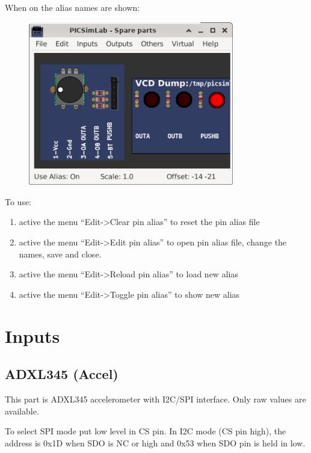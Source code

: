 When on the alias names are shown:
\begin{figure}[H]
\center
\includegraphics[width=0.80\textwidth]{img/pin_alias_on.png} 
\end{figure} 

To use:
\begin{enumerate}
 \item active the menu ``Edit->Clear pin alias'' to reset the pin alias file
 \item active the menu ``Edit->Edit pin alias'' to open pin alias file, change the names, save and close.
 \item active the menu ``Edit->Reload pin alias'' to load new alias
 \item active the menu ``Edit->Toggle pin alias'' to show new alias
\end{enumerate}


\section{Inputs}

\subsection{ADXL345 (Accel)}

This part is ADXL345 accelerometer with I2C/SPI interface. 
Only raw values are available.

To select SPI mode put low level in CS pin.
In I2C mode (CS pin high), the address is 0x1D when SDO is NC or high and 0x53 when SDO pin is held in low. 

